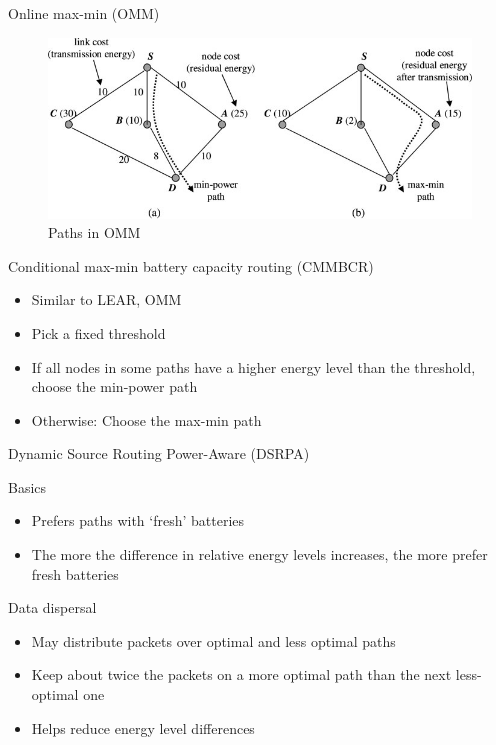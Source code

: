 \documentclass{beamer}
\begin{document}
\begin{frame}{Online max-min (OMM)}
\begin{figure}
\centering
\includegraphics[width=\textwidth]{images/omm}
\caption{Paths in OMM\cite{alotaibi2012survey}}
\label{ommex}
\end{figure}
\end{frame}

\begin{frame}{Conditional max-min battery capacity routing (CMMBCR)\cite{toh2001maximum}}
    \begin{itemize}
        \item Similar to LEAR, OMM
        \item Pick a fixed threshold
        \item If all nodes in some paths have a higher energy level than the threshold, choose the min-power path
        \item Otherwise: Choose the max-min path
    \end{itemize}
\end{frame}

\begin{frame}{Dynamic Source Routing Power-Aware (DSRPA)\cite{djenouri2006new}}
    \begin{block}{Basics}
        \begin{itemize}
            \item Prefers paths with `fresh' batteries
            \item The more the difference in relative energy levels increases, the more prefer fresh batteries
        \end{itemize}
    \end{block}
    \begin{block}{Data dispersal}
        \begin{itemize}
            \item May distribute packets over optimal and less optimal paths
            \item Keep about twice the packets on a more optimal path than the next less-optimal one
            \item Helps reduce energy level differences
        \end{itemize}
    \end{block}
\end{frame}
\end{document}
